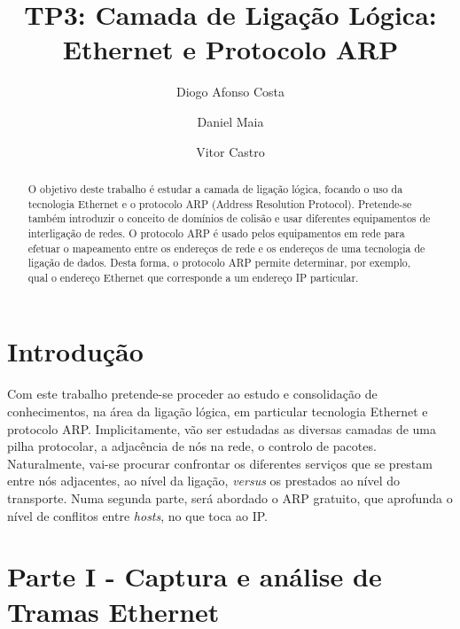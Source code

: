 \documentclass{llncs}
\begin{document}
\mainmatter
\title{TP3: Camada de Ligação Lógica: Ethernet e Protocolo ARP}


\author{Diogo Afonso Costa \and Daniel Maia \and Vitor Castro}



\date{}


\maketitle
\begin{abstract}
O objetivo deste trabalho é estudar a camada de ligação lógica, focando o uso da tecnologia Ethernet e o protocolo ARP (Address Resolution Protocol). Pretende-se
também introduzir o conceito de domínios de colisão e usar diferentes equipamentos de interligação de redes. O protocolo ARP é usado pelos equipamentos em rede para efetuar o mapeamento entre os endereços de rede e os endereços de uma tecnologia de ligação de dados. Desta forma, o protocolo ARP permite determinar, por exemplo, qual o endereço Ethernet que corresponde a um endereço IP particular.
\end{abstract}

\section{Introdução}

Com este trabalho pretende-se proceder ao estudo e consolidação de conhecimentos, na área da ligação lógica, em particular tecnologia Ethernet e protocolo ARP.
Implicitamente, vão ser estudadas as diversas camadas de uma pilha protocolar, a adjacência de nós na rede, o controlo de pacotes. Naturalmente, vai-se procurar confrontar os diferentes serviços que se prestam entre nós adjacentes, ao nível da ligação, \textit{versus} os prestados ao nível do transporte.
Numa segunda parte, será abordado o ARP gratuito, que aprofunda o nível de conflitos entre \textit{hosts}, no que toca ao IP.


\clearpage
\section{Parte I - Captura e análise de Tramas Ethernet}
\end{document}

